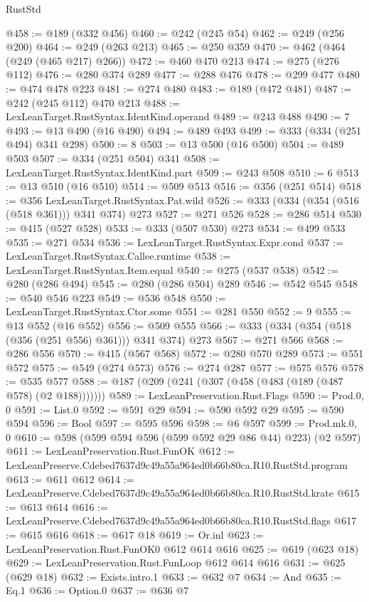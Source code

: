 \begin{lexlean}{RustStd}
\begin{coremodule}
@458 := @189 (@332 @456)
@460 := @242 (@245 @54)
@462 := @249 (@256 @200)
@464 := @249 (@263 @213)
@465 := @250 @359
@470 := @462 (@464 (@249 (@465 @217) @266))
@472 := @460 @470 @213
@474 := @275 (@276 @112)
@476 := @280 @374 @289
@477 := @288 @476
@478 := @299 @477
@480 := @474 @478 @223
@481 := @274 @480
@483 := @189 (@472 @481)
@487 := @242 (@245 @112) @470 @213
@488 := LexLeanTarget.RustSyntax.IdentKind.operand
@489 := @243 @488
@490 := 7
@493 := @13 @490 (@16 @490)
@494 := @489 @493
@499 := @333 (@334 (@251 @494) @341 @298)
@500 := 8
@503 := @13 @500 (@16 @500)
@504 := @489 @503
@507 := @334 (@251 @504) @341
@508 := LexLeanTarget.RustSyntax.IdentKind.part
@509 := @243 @508
@510 := 6
@513 := @13 @510 (@16 @510)
@514 := @509 @513
@516 := @356 (@251 @514)
@518 := @356 LexLeanTarget.RustSyntax.Pat.wild
@526 := @333 (@334 (@354 (@516 (@518 @361))) @341 @374) @273
@527 := @271 @526
@528 := @286 @514
@530 := @415 (@527 @528)
@533 := @333 (@507 @530) @273
@534 := @499 @533
@535 := @271 @534
@536 := LexLeanTarget.RustSyntax.Expr.cond
@537 := LexLeanTarget.RustSyntax.Callee.runtime
@538 := LexLeanTarget.RustSyntax.Item.equal
@540 := @275 (@537 @538)
@542 := @280 (@286 @494)
@545 := @280 (@286 @504) @289
@546 := @542 @545
@548 := @540 @546 @223
@549 := @536 @548
@550 := LexLeanTarget.RustSyntax.Ctor.some
@551 := @281 @550
@552 := 9
@555 := @13 @552 (@16 @552)
@556 := @509 @555
@566 := @333 (@334 (@354 (@518 (@356 (@251 @556) @361))) @341 @374) @273
@567 := @271 @566
@568 := @286 @556
@570 := @415 (@567 @568)
@572 := @280 @570 @289
@573 := @551 @572
@575 := @549 (@274 @573)
@576 := @274 @287
@577 := @575 @576
@578 := @535 @577
@588 := @187 (@209 (@241 (@307 (@458 (@483 (@189 (@487 @578) (@2 @188)))))))
@589 := LexLeanPreservation.Rust.Flags
@590 := Prod.{0, 0}
@591 := List.{0}
@592 := @591 @29
@594 := @590 @592 @29
@595 := @590 @594
@596 := Bool
@597 := @595 @596
@598 := @6 @597
@599 := Prod.mk.{0, 0}
@610 := @598 (@599 @594 @596 (@599 @592 @29 @86 @44) @223) (@2 @597)
@611 := LexLeanPreservation.Rust.FunOK
@612 := LexLeanPreserve.Cdebed7637d9c49a55a964ed0b66b80ca.R10.RustStd.program
@613 := @611 @612
@614 := LexLeanPreserve.Cdebed7637d9c49a55a964ed0b66b80ca.R10.RustStd.krate
@615 := @613 @614
@616 := LexLeanPreserve.Cdebed7637d9c49a55a964ed0b66b80ca.R10.RustStd.flags
@617 := @615 @616
@618 := @617 @18
@619 := Or.inl
@623 := LexLeanPreservation.Rust.FunOK0 @612 @614 @616
@625 := @619 (@623 @18)
@629 := LexLeanPreservation.Rust.FunLoop @612 @614 @616
@631 := @625 (@629 @18)
@632 := Exists.intro.{1}
@633 := @632 @7
@634 := And
@635 := Eq.{1}
@636 := Option.{0}
@637 := @636 @7

\end{coremodule}
\end{lexlean}
